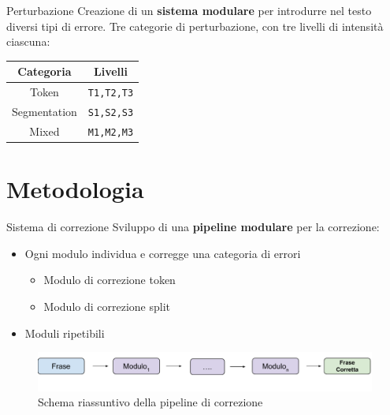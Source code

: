 \documentclass{beamer}
\begin{document}
\begin{frame}{Perturbazione}
Creazione di un \textbf{sistema modulare} per introdurre nel testo diversi tipi di errore.
\newline \newline
Tre categorie di perturbazione, con tre livelli di intensità ciascuna:
\begin{table}[H]
\centering
\begin{tabular}{cc}
\textbf{Categoria} & \textbf{Livelli} \\ \hline
Token & \texttt{T1,T2,T3}\\
Segmentation & \texttt{S1,S2,S3}\\
Mixed & \texttt{M1,M2,M3}\\
\end{tabular}
\end{table}




\end{frame}

\section{Metodologia}

\begin{frame}{Sistema di correzione}
Sviluppo di una \textbf{pipeline modulare} per la correzione:
\begin{itemize}
\item Ogni modulo individua e corregge una categoria di errori
	\begin{itemize}
	\item Modulo di correzione token
	\item Modulo di correzione split
	\end{itemize}
\item Moduli ripetibili 
\end{itemize}

\begin{figure}[H]
\centering
\includegraphics[width=\textwidth]{images/slides/generale}
\caption{Schema riassuntivo della pipeline di correzione}
\label{fig:met_generale}
\end{figure}


\end{frame}
\end{document}
